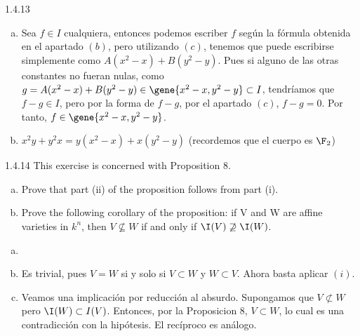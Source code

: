 \documentclass[twoside]{article}
\begin{document}
\begin{ejercicio}{1.4.13}
\begin{solucion}
\begin{enumerate}[a.]
\item Sea $f\in I$ cualquiera, entonces podemos escriber $f$ según la fórmula obtenida en el apartado $(b)$, pero utilizando $(c)$, tenemos que puede escribirse simplemente como $A(x^2-x)+B(y^2-y)$. Pues si alguno de las otras constantes no fueran nulas, como $g = A(x^2-x)+B(y^2-y)\in \gene{x^2-x,y^2-y} \subset I$, tendríamos que $f-g\in I$, pero por la forma de $f-g$, por el apartado $(c)$, $f-g=0$. Por tanto, $f\in \gene{x^2-x,y^2-y}$.
\item $x^2y + y^2x=y(x^2-x)+x(y^2-y)$ (recordemos que el cuerpo es $\F_2$)
\end{enumerate}
\end{solucion} 
\end{ejercicio}
\newpage
\begin{ejercicio}{1.4.14}
This exercise is concerned with Proposition 8.
\begin{enumerate}[a.]
\item Prove that part (ii) of the proposition follows from part (i).
\item Prove the following corollary of the proposition: if V and W are affine varieties in $k^n$, then $V \not\subseteq W$ if and only if $\I(V)\not\supseteq\I(W)$.
\end{enumerate}
\end{ejercicio}
\begin{solucion}
\begin{enumerate}[a.]
\item[]
\item Es trivial, pues $V=W$ si y solo si $V\subset W$ y $W \subset V$. Ahora basta aplicar $(i)$.
\item Veamos una implicación por reducción al absurdo. Supongamos que $V\not \subset W$ pero $\I(W)\subset I(V)$. Entonces, por la Proposicion 8, $V\subset W$, lo cual es una contradicción con la hipótesis. El recíproco es análogo.
\end{enumerate}
\end{solucion}
\newpage
\end{document}
